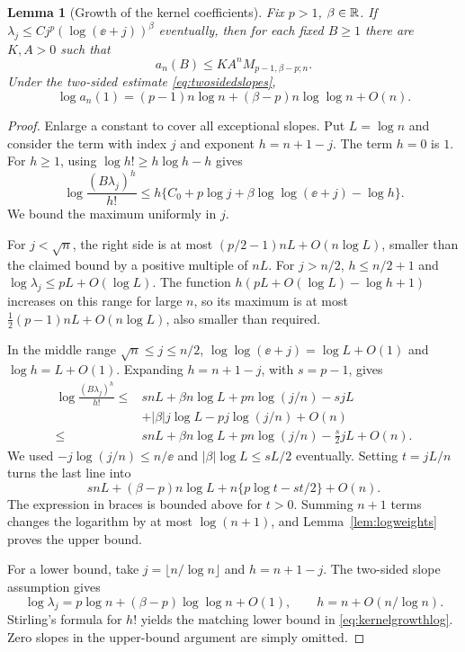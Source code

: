 \documentclass[11pt,a4paper]{article}
\numberwithin{equation}{section}
\newtheorem{lemma}[theorem]{Lemma}
\theoremstyle{definition}\newtheorem{definition}[theorem]{Definition}
\theoremstyle{remark}\newtheorem{remark}[theorem]{Remark}
\begin{document}
\begin{lemma}[Growth of the kernel coefficients]
\label{lem:kernelgrowth}
Fix $p>1$, $\beta\in\mathbb R$. If
$\lambda_j\le Cj^p(\log(\ee+j))^\beta$ eventually, then for each
fixed $B\ge1$ there are $K,A>0$ such that
\begin{equation}
 a_n(B)\le KA^nM_{p-1,\beta-p;n}.
 \label{eq:kernelgrowthupper}
\end{equation}
Under the two-sided estimate \eqref{eq:twosidedslopes},
\begin{equation}
 \log a_n(1)=(p-1)n\log n+(\beta-p)n\log\log n+O(n).
 \label{eq:kernelgrowthlog}
\end{equation}
\end{lemma}
\begin{proof}
Enlarge a constant to cover all exceptional slopes. Put $L=\log n$ and
consider the term with index $j$ and exponent $h=n+1-j$. The term $h=0$
is $1$. For $h\ge1$, using $\log h!\ge h\log h-h$ gives
\begin{equation}
 \log\frac{(B\lambda_j)^h}{h!}
 \le h\{C_0+p\log j+\beta\log\log(\ee+j)-\log h\}.
 \label{eq:optimization-start}
\end{equation}
We bound the maximum uniformly in $j$.

For $j<\sqrt n$, the right side is at most
$(p/2-1)nL+O(n\log L)$, smaller than the claimed bound by a positive
multiple of $nL$. For $j>n/2$, $h\le n/2+1$ and
$\log\lambda_j\le pL+O(\log L)$. The function
$h(pL+O(\log L)-\log h+1)$ increases on this range for large $n$,
so its maximum is at most
$\tfrac12(p-1)nL+O(n\log L)$, also smaller than required.

In the middle range $\sqrt n\le j\le n/2$,
$\log\log(\ee+j)=\log L+O(1)$ and $\log h=L+O(1)$.
Expanding $h=n+1-j$, with $s=p-1$, gives
\begin{align*}
 \log\frac{(B\lambda_j)^h}{h!}
 \le{}&snL+\beta n\log L+pn\log(j/n)-sjL\\
      &+|\beta|j\log L-pj\log(j/n)+O(n)\\
 \le{}&snL+\beta n\log L+pn\log(j/n)-\tfrac s2jL+O(n).
\end{align*}
We used $-j\log(j/n)\le n/\ee$ and
$|\beta|\log L\le sL/2$ eventually. Setting $t=jL/n$ turns the last
line into
\[
 snL+(\beta-p)n\log L+n\{p\log t-st/2\}+O(n).
\]
The expression in braces is bounded above for $t>0$. Summing $n+1$
terms changes the logarithm by at most $\log(n+1)$, and
Lemma~\ref{lem:logweights} proves the upper bound.

For a lower bound, take $j=\lfloor n/\log n\rfloor$ and $h=n+1-j$.
The two-sided slope assumption gives
\[
 \log\lambda_j=p\log n+(\beta-p)\log\log n+O(1),
 \qquad h=n+O(n/\log n).
\]
Stirling's formula for $h!$ yields the matching lower bound in
\eqref{eq:kernelgrowthlog}. Zero slopes in the upper-bound argument are
simply omitted.
\end{proof}
\end{document}
